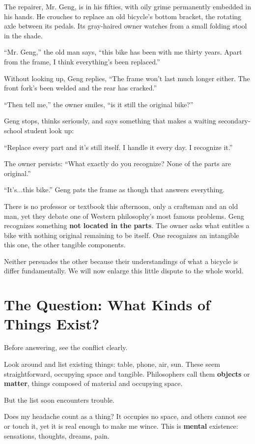 The repairer, Mr. Geng, is in his fifties, with oily grime permanently embedded in his hands. He crouches to replace an old bicycle's bottom bracket, the rotating axle between its pedals. Its gray-haired owner watches from a small folding stool in the shade.

``Mr. Geng,'' the old man says, ``this bike has been with me thirty years. Apart from the frame, I think everything's been replaced.''

Without looking up, Geng replies, ``The frame won't last much longer either. The front fork's been welded and the rear has cracked.''

``Then tell me,'' the owner smiles, ``is it still the original bike?''

Geng stops, thinks seriously, and says something that makes a waiting secondary-school student look up:

``Replace every part and it's still itself. I handle it every day. I recognize it.''

The owner persists: ``What exactly do you recognize? None of the parts are original.''

``It's...this bike.'' Geng pats the frame as though that answers everything.

There is no professor or textbook this afternoon, only a craftsman and an old man, yet they debate one of Western philosophy's most famous problems. Geng recognizes something \textbf{not located in the parts}. The owner asks what entitles a bike with nothing original remaining to be itself. One recognizes an intangible this one, the other tangible components.

Neither persuades the other because their understandings of what a bicycle is differ fundamentally. We will now enlarge this little dispute to the whole world.

\section{The Question: What Kinds of Things Exist?}
Before answering, see the conflict clearly.

Look around and list existing things: table, phone, air, sun. These seem straightforward, occupying space and tangible. Philosophers call them \textbf{objects} or \textbf{matter}, things composed of material and occupying space.

But the list soon encounters trouble.

Does my headache count as a thing? It occupies no space, and others cannot see or touch it, yet it is real enough to make me wince. This is \textbf{mental} existence: sensations, thoughts, dreams, pain.

